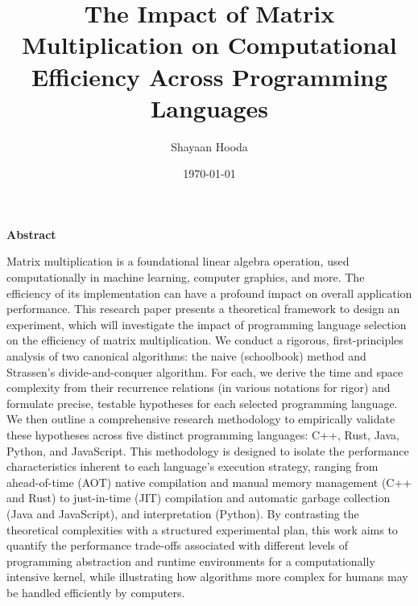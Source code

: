 \documentclass[11pt, a4paper, titlepage]{scrartcl}
\title{\vspace{-2cm}\textbf{\Huge The Impact of Matrix Multiplication on Computational Efficiency Across Programming Languages}}
\author[1]{Shayaan Hooda}
\affil[1]{Oakton High School Research Project}
\date{\today}
\begin{document}
\maketitle
\vspace{-1.5em}
\begin{center}
\textbf{Abstract}
\end{center}

\begin{tcolorbox}
Matrix multiplication is a foundational linear algebra operation, used computationally in machine learning, computer graphics, and more. The efficiency of its implementation can have a profound impact on overall application performance. This research paper presents a theoretical framework to design an experiment, which will investigate the impact of programming language selection on the efficiency of matrix multiplication. We conduct a rigorous, first-principles analysis of two canonical algorithms: the naive (schoolbook) method and Strassen’s divide-and-conquer algorithm. For each, we derive the time and space complexity from their recurrence relations (in various notations for rigor) and formulate precise, testable hypotheses for each selected programming language. We then outline a comprehensive research methodology to empirically validate these hypotheses across five distinct programming languages: C++, Rust, Java, Python, and JavaScript. This methodology is designed to isolate the performance characteristics inherent to each language's execution strategy, ranging from ahead-of-time (AOT) native compilation and manual memory management (C++ and Rust) to just-in-time (JIT) compilation and automatic garbage collection (Java and JavaScript), and interpretation (Python). By contrasting the theoretical complexities with a structured experimental plan, this work aims to quantify the performance trade-offs associated with different levels of programming abstraction and runtime environments for a computationally intensive kernel, while illustrating how algorithms more complex for humans may be handled efficiently by computers.
\end{tcolorbox}

\vspace{1.5em}
\tableofcontents
\newpage

\end{document}
